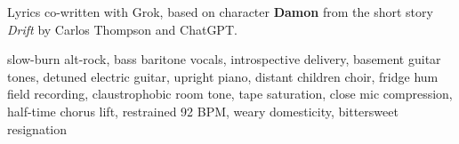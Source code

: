 

\begin{notes}
Lyrics co-written with Grok, based on character \textbf{Damon} from the short story \emph{Drift} by Carlos Thompson and ChatGPT.
\end{notes}

\begin{style}
slow-burn alt-rock, bass baritone vocals, introspective delivery, basement guitar tones, detuned electric guitar, upright piano, distant children choir, fridge hum field recording, claustrophobic room tone, tape saturation, close mic compression, half-time chorus lift, restrained 92 BPM, weary domesticity, bittersweet resignation
\end{style}

